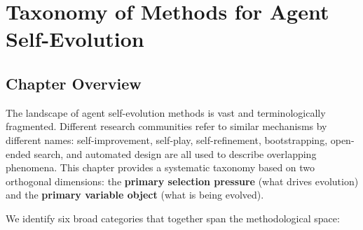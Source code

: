 
\section{Taxonomy of Methods for Agent Self-Evolution}\label{ch:methods}

\subsection{Chapter Overview}\label{sec:ch3-overview}

The landscape of agent self-evolution methods is vast and terminologically fragmented. Different research communities refer to similar mechanisms by different names: self-improvement, self-play, self-refinement, bootstrapping, open-ended search, and automated design are all used to describe overlapping phenomena. This chapter provides a systematic taxonomy based on two orthogonal dimensions: the \textbf{primary selection pressure} (what drives evolution) and the \textbf{primary variable object} (what is being evolved).

We identify six broad categories that together span the methodological space:


